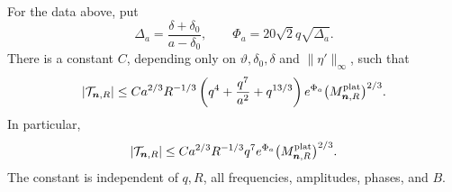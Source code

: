 \begin{theorem}\label{thm:ub-flux}
For the data above, put
\[
 \Delta_a=\frac{\delta+\delta_0}{a-\delta_0},\qquad
 \Phi_a=20\sqrt2q\sqrt{\Delta_a}.
\]
There is a constant $C$, depending only on
$\vartheta,\delta_0,\delta$ and $\|\eta'\|_\infty$, such that
\begin{equation}\label{eq:ub-main-refined}
 |\mathcal T_{\boldsymbol n,R}|
 \le C a^{2/3}R^{-1/3}
       \left(q^4+\frac{q^7}{a^2}+q^{13/3}\right)e^{\Phi_a}
       \bigl(M^{\rm plat}_{\boldsymbol n,R}\bigr)^{2/3}.
\end{equation}
In particular,
\begin{equation}\label{eq:ub-main}
 |\mathcal T_{\boldsymbol n,R}|
 \le C a^{2/3}R^{-1/3}q^7e^{\Phi_a}
       \bigl(M^{\rm plat}_{\boldsymbol n,R}\bigr)^{2/3}.
\end{equation}
The constant is independent of $q,R$, all frequencies, amplitudes,
phases, and $B$.
\end{theorem}

